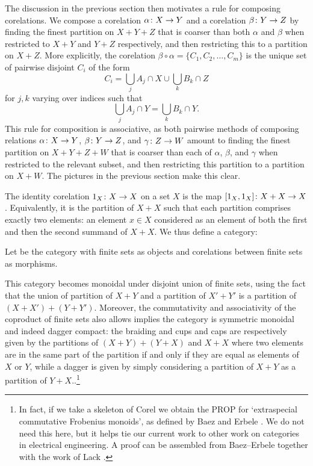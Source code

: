The discussion in the previous section then motivates a rule for composing corelations. We compose a corelation $\alpha {\colon} X \to Y$ and a corelation $\beta {\colon} Y \to Z$ by finding the finest partition on $X+Y+Z$ that is coarser than both $\alpha$ and $\beta$ when restricted to $X+Y$ and $Y+Z$ respectively, and then restricting this to a
partition on $X+Z$. More explicitly, the corelation $\beta\circ\alpha = \{C_1,
C_2, \dots, C_m\}$ is the unique set of pairwise disjoint $C_i$ of the form 
\[
  C_i = \bigcup_j A_j \cap X \cup \bigcup_k B_k \cap Z
\]
for $j,k$ varying over indices such that 
\[
  \bigcup_j A_j \cap Y = \bigcup_k B_k \cap Y.
\]
This rule for composition is associative, as both pairwise methods of composing relations
$\alpha{\colon} X \to Y$, $\beta{\colon} Y \to Z$, and $\gamma{\colon} Z \to W$ amount to finding the finest partition on $X+Y+Z+W$ that is coarser than each of $\alpha$, $\beta$, and $\gamma$ when restricted to the relevant subset, and then restricting this
partition to a partition on $X+W$.  The pictures in the previous section make this clear.

The identity corelation $1_X{\colon} X \to X$ on a set $X$ is the map $[1_X,1_X]{\colon} X+X \to X$. Equivalently, it is the partition of $X+X$ such that each partition
comprises exactly two elements: an element $x \in X$ considered as an element of
both the first and then the second summand of $X+X$. We thus define a category:

\begin{definition}
  Let  be the category with finite sets as objects and
  corelations between finite sets as morphisms. 
\end{definition}

This category becomes monoidal under disjoint union of finite sets, using the
fact that the union of partition of $X + Y$ and a partition of $X' + Y'$ is a
partition of $(X+X') + (Y+Y')$. Moreover, the commutativity and associativity of
the coproduct of finite sets also allows implies the category is symmetric
monoidal and indeed dagger compact: the braiding and cups and caps are
respectively given by the partitions of $(X+Y)+(Y+X)$ and $X+X$ where two
elements are in the same part of the partition if and only if they are equal as
elements of $X$ or $Y$, while a dagger is given by simply considering a
partition of $X+Y$ as a partition of $Y+X$..\footnote{In fact, if we take a
  skeleton of $\mathrm{Corel}$ we obtain the PROP for `extraspecial commutative
  Frobenius monoids', as defined by Baez and Erbele \cite{BE}.  We do not need
  this here, but it helps tie our current work to other work on categories in
  electrical engineering.  A proof can be assembled from Baez--Erbele together
  with the work of Lack \cite{La}.}

